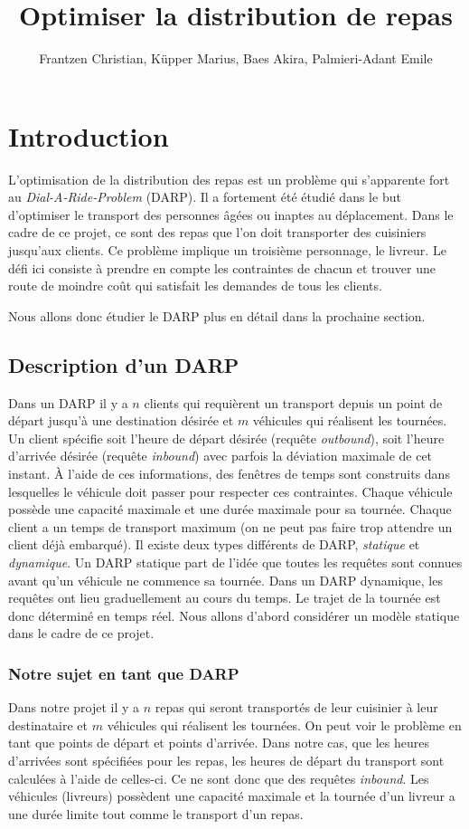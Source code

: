 \documentclass[10pt,a4paper]{report}
\author{Frantzen Christian, Küpper Marius, Baes Akira, Palmieri-Adant Emile}
\title{Optimiser la distribution de repas}
\begin{document}
\maketitle
\chapter*{Introduction}
L'optimisation de la distribution des repas est un problème qui s'apparente fort au \textit{Dial-A-Ride-Problem} (DARP). Il a fortement été étudié dans le but d'optimiser le transport des personnes âgées ou inaptes au déplacement. Dans le cadre de ce projet, ce sont des repas que l'on doit transporter des cuisiniers jusqu'aux clients. Ce problème implique un troisième personnage, le livreur. Le défi ici consiste à prendre en compte les contraintes de chacun et trouver une route de moindre coût qui satisfait les demandes de tous les clients.
    
Nous allons donc étudier le DARP plus en détail dans la prochaine section.


\section*{Description d'un DARP}
Dans un DARP il y a $n$ clients qui requièrent un transport depuis un point de départ jusqu'à une destination désirée et $m$ véhicules qui réalisent les tournées. Un client spécifie soit l'heure de départ désirée (requête \textit{outbound}), soit l'heure d'arrivée désirée (requête \textit{inbound}) avec parfois la déviation maximale de cet instant. À l'aide de ces informations, des fenêtres de temps sont construits dans lesquelles le véhicule doit passer pour respecter ces contraintes. Chaque véhicule possède une capacité maximale et une durée maximale pour sa tournée. Chaque client a un temps de transport maximum (on ne peut pas faire trop attendre un client déjà embarqué).\newline
 Il existe deux types différents de DARP, \textit{statique} et \textit{dynamique}. Un DARP statique part de l'idée que toutes les requêtes sont connues avant qu'un véhicule ne commence sa tournée. Dans un DARP dynamique, les requêtes ont lieu graduellement au cours du temps. Le trajet de la tournée est donc déterminé en temps réel. 
    Nous allons d'abord considérer un modèle statique dans le cadre de ce projet.
\subsection*{Notre sujet en tant que DARP}
Dans notre projet il y a $n$ repas qui seront transportés de leur cuisinier à leur destinataire et $m$ véhicules qui réalisent les tournées. On peut voir le problème en tant que points de départ et points d'arrivée. Dans notre cas, que les heures d'arrivées sont spécifiées pour les repas, les heures de départ du transport sont calculées à l'aide de celles-ci. Ce ne sont donc que des requêtes \textit{inbound}. Les véhicules (livreurs) possèdent une capacité maximale et la tournée d’un livreur a une durée limite tout comme le transport d’un repas. 
\end{document}
